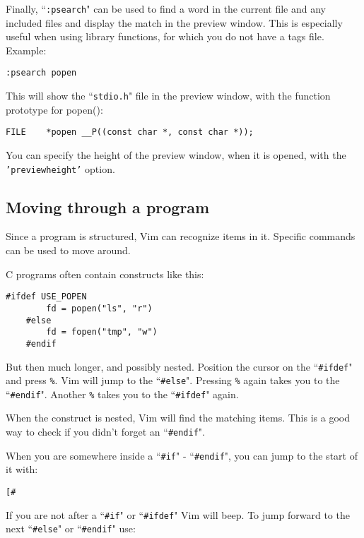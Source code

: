 Finally, ``\texttt{:psearch}" can be used to find a word in the current file and any included files and display the match in the preview window.
This is especially useful when using library functions, for which you do not have a tags file.
Example:

\begin{Verbatim}[samepage=true]
 :psearch popen
\end{Verbatim}

This will show the ``\texttt{stdio.h}" file in the preview window, with the function prototype for popen():

\begin{Verbatim}[samepage=true]
    FILE    *popen __P((const char *, const char *));
\end{Verbatim}

You can specify the height of the preview window, when it is opened, with the \texttt{'previewheight'} option.
\subsection{Moving through a program}
Since a program is structured, Vim can recognize items in it.
Specific commands can be used to move around.

C programs often contain constructs like this:

\begin{Verbatim}[samepage=true]
    #ifdef USE_POPEN
        fd = popen("ls", "r")
    #else
        fd = fopen("tmp", "w")
    #endif
\end{Verbatim}

But then much longer, and possibly nested.
Position the cursor on the ``\texttt{\#ifdef}" and press \texttt{\%}.
Vim will jump to the ``\texttt{\#else}".
Pressing \texttt{\%} again takes you to the ``\texttt{\#endif}".
Another \texttt{\%} takes you to the ``\texttt{\#ifdef}" again.

When the construct is nested, Vim will find the matching items.
This is a good way to check if you didn't forget an ``\texttt{\#endif}".

When you are somewhere inside a ``\texttt{\#if}" - ``\texttt{\#endif}", you can jump to the start of it with:

\begin{Verbatim}[samepage=true]
 [#
\end{Verbatim}

If you are not after a ``\texttt{\#if}" or ``\texttt{\#ifdef}" Vim will beep.
To jump forward to the next ``\texttt{\#else}" or ``\texttt{\#endif}" use:

